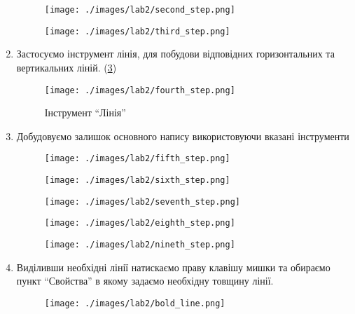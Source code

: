 \begin{enumerate}[leftmargin=*]
\begin{figure}[!ht]
  \centering
  \texttt{[image: ./images/lab2/second\_step.png]}
  \caption{\label{fig:second_step}}
\end{figure}
\begin{figure}[!ht]
  \centering
  \texttt{[image: ./images/lab2/third\_step.png]}
  \caption{\label{fig:third_step}}
\end{figure}

\FloatBarrier

\item Застосуємо інструмент лінія, для побудови відповідних горизонтальних та вертикальних ліній. (\ref{fig:line})
  \begin{figure}[!htb]
  \centering
  \texttt{[image: ./images/lab2/fourth\_step.png]}
  \caption{Інструмент ``Лінія''}
  \label{fig:line}
\end{figure}
\FloatBarrier

\item Добудовуємо залишок основного напису використовуючи вказані інструменти
  \begin{figure}[!htb]
  \centering
  \texttt{[image: ./images/lab2/fifth\_step.png]}
  \caption{ \label{fig:fifth_step}}
\end{figure}
\begin{figure}[!htb]
  \centering
  \texttt{[image: ./images/lab2/sixth\_step.png]}
  \caption{}
  \label{fig:sixth_step} 
\end{figure}
\begin{figure}[!htb]
  \centering
  \texttt{[image: ./images/lab2/seventh\_step.png]}
  \caption{}
  \label{fig:seventh_step} 
\end{figure}
\begin{figure}[!htb]
  \centering
  \texttt{[image: ./images/lab2/eighth\_step.png]}
  \caption{}
  \label{fig:eigth_step} 
\end{figure}
\begin{figure}[!htb]
  \centering
  \texttt{[image: ./images/lab2/nineth\_step.png]}
  \caption{}
  \label{fig:nineth_step} 
\end{figure}

\FloatBarrier
\item Виділивши необхідні лінії натискаємо праву клавішу мишки та обираємо пункт ``Свойства'' в
  якому задаємо необхідну товщину лінії.
  \begin{figure}[!htb]
  \centering
  \texttt{[image: ./images/lab2/bold\_line.png]}
  \caption{}
  \label{fig:nineth_step}
\end{figure}
\FloatBarrier
  
\end{enumerate}

